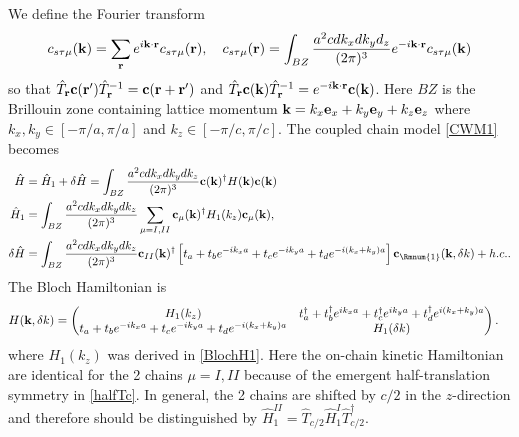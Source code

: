 We define the Fourier transform \begin{align}c_{s\tau\mu}({\bf k})=\sum_{\bf r}e^{i{\bf k}\cdot{\bf r}}c_{s\tau\mu}({\bf r}),\quad c_{s\tau\mu}({\bf r})=\int_{BZ}\frac{a^2cdk_xdk_yd_z}{(2\pi)^3}e^{-i{\bf k}\cdot{\bf r}}c_{s\tau\mu}({\bf k})\end{align} so that $\hat{T}_{\bf r}{\bf c}({\bf r}')\hat{T}_{\bf r}^{-1}={\bf c}({\bf r}+{\bf r}')$ and $\hat{T}_{\bf r}{\bf c}({\bf k})\hat{T}_{\bf r}^{-1}=e^{-i{\bf k}\cdot{\bf r}}{\bf c}({\bf k})$. Here $BZ$ is the Brillouin zone containing lattice momentum ${\bf k}=k_x{\bf e}_x+k_y{\bf e}_y+k_z{\bf e}_z$ where $k_x,k_y\in[-\pi/a,\pi/a]$ and $k_z\in[-\pi/c,\pi/c]$. The coupled chain model \eqref{CWM1} becomes \begin{align}\begin{split}\hat{H}&=\hat{H}_1+\delta\hat{H}=\int_{BZ}\frac{a^2cdk_xdk_ydk_z}{(2\pi)^3}{\bf c}({\bf k})^\dagger H({\bf k}){\bf c}({\bf k})\\\hat{H}_1&=\int_{BZ}\frac{a^2cdk_xdk_ydk_z}{(2\pi)^3}\sum_{\mu=I,II}{\bf c}_\mu({\bf k})^\dagger H_1(k_z){\bf c}_\mu({\bf k}),\\\delta\hat{H}&=\int_{BZ}\frac{a^2cdk_xdk_ydk_z}{(2\pi)^3}{\bf c}_{II}({\bf k})^\dagger\left[t_a+t_be^{-ik_xa}+t_ce^{-ik_ya}+t_de^{-i(k_x+k_y)a}\right]{\bf c}_{\Rmnum{1}}({\bf k},\delta k)+h.c..\end{split}\label{CWM2}\end{align} The Bloch Hamiltonian is \begin{align}H({\bf k},\delta k)&=\begin{pmatrix}H_1(k_z)&t_a^\dagger+t_b^\dagger e^{ik_xa}+t_c^\dagger e^{ik_ya}+t_d^\dagger e^{i(k_x+k_y)a}\\t_a+t_be^{-ik_xa}+t_ce^{-ik_ya}+t_de^{-i(k_x+k_y)a}&H_1(\delta k)\end{pmatrix}.\label{Blochansatz1}\end{align} where $H_1(k_z)$ was derived in \eqref{BlochH1}. Here the on-chain kinetic Hamiltonian are identical for the 2 chains $\mu=I,II$ because of the emergent half-translation symmetry in \eqref{halfTc}. In general, the 2 chains are shifted by $c/2$ in the $z$-direction and therefore should be distinguished by $\hat{H}^{II}_1=\hat{T}_{c/2}\hat{H}^I_1\hat{T}_{c/2}^\dagger$.

